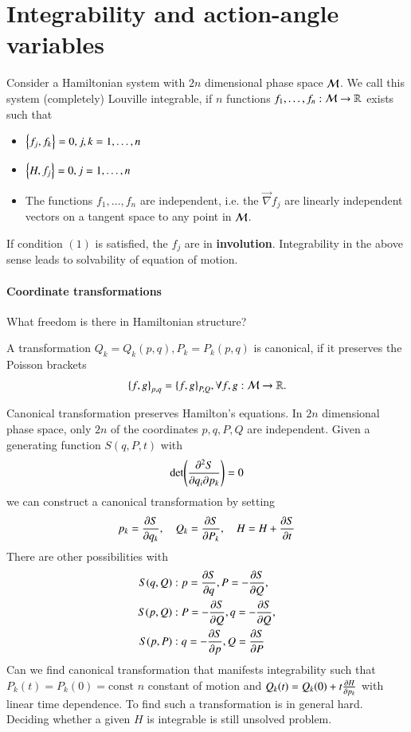 \section{Integrability and action-angle variables}
\begin{definition}
	Consider a Hamiltonian system with $2n$ dimensional phase space $\mathcal{M}$. We call this system (completely) Louville integrable, if $n$ functions $f_1, \dots, f_n: \mathcal{M} \rightarrow \mathbb{R}$ exists such that
	\begin{itemize}
		\item $\pb{f_j}{f_k} = 0, j, k = 1, \dots, n$
		\item $\pb{H}{f_j} = 0, j=1, \dots, n$
		\item The functions $f_1, \dots, f_n$ are independent, i.e. the $\vec{\nabla} f_j$ are linearly independent vectors on a tangent space to any point in $\mathcal{M}$.
	\end{itemize}
\end{definition}
If condition $(1)$ is satisfied, the $f_j$ are in \textbf{involution}. Integrability in the above sense leads to solvability of equation of motion.

\paragraph{Coordinate transformations}
What freedom is there in Hamiltonian structure?

\begin{definition}
	A transformation $Q_k = Q_k(p, q), P_k = P_k(p, q)$ is canonical, if it preserves the Poisson brackets
	\begin{equation*}
		\pb{f}{g}_{p, q} = \pb{f}{g}_{P, Q}, \forall f,g: \M \rightarrow \R.
	\end{equation*}
\end{definition}
Canonical transformation preserves Hamilton's equations. In $2n$ dimensional phase space, only $2n$ of the coordinates $p, q, P, Q$ are independent. Given a generating function $S(q, P, t)$ with
\begin{equation*}
	\det(\pdv[2]{S}{q_i}{p_k}) = 0	
\end{equation*}
we can construct a canonical transformation by setting 
\begin{equation}
	p_k = \pdv{S}{q_k}, \quad Q_k = \pdv{S}{P_k}, \quad H = H+ \pdv{S}{t}
\end{equation}
There are other possibilities with
\begin{align*}
	S(q, Q):& \; p = \pdv{S}{q} , P=-\pdv{S}{Q} , \\
	S(p, Q):& \; P = -\pdv{S}{Q}, q = - \pdv{S}{Q}, \\
	S(p, P):& \; q = - \pdv{S}{p}, Q= \pdv{S}{P}
	\label{eq:}
\end{align*}
Can we find canonical transformation that manifests integrability such that $P_k(t) = P_k(0) =\text{const}$ $n$ constant of motion and $Q_k(t) = Q_k(0) + t \pdv{H}{p_k}$ with linear time dependence. To find such a transformation is in general hard. Deciding whether a given $H$ is integrable is still unsolved problem.

